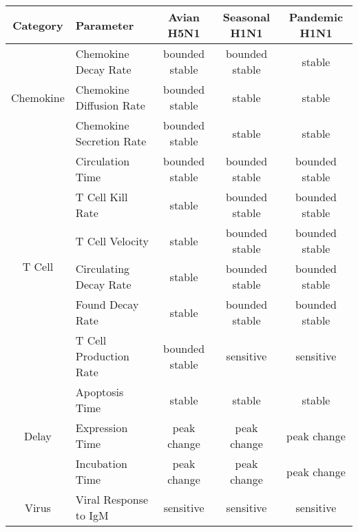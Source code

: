 \documentclass[10pt]{article}
\begin{document}
\begin{table}[!ht]
\begin{center}
\begin{tabular}{| c | l | c c c |}
  \hline                        
  Category & Parameter & Avian H5N1 & Seasonal H1N1 & Pandemic H1N1 \\
  \hline
  \multirow{3}{*}{Chemokine} & Chemokine Decay Rate & \cellcolor{blue!30}bounded stable & \cellcolor{blue!30}bounded stable & \cellcolor{green!50}stable \\
  & Chemokine Diffusion Rate & \cellcolor{blue!30}bounded stable & \cellcolor{green!50}stable& \cellcolor{green!50}stable \\
  & Chemokine Secretion Rate & \cellcolor{blue!30}bounded stable & \cellcolor{green!50}stable & \cellcolor{green!50}stable \\
  \hline
  \multirow{6}{*}{T Cell} & Circulation Time & \cellcolor{blue!30}bounded stable & \cellcolor{blue!30}bounded stable & \cellcolor{blue!30}bounded stable \\
  & T Cell Kill Rate & \cellcolor{green!50}stable & \cellcolor{blue!30}bounded stable & \cellcolor{blue!30}bounded stable \\
  & T Cell Velocity & \cellcolor{green!50}stable & \cellcolor{blue!30}bounded stable & \cellcolor{blue!30}bounded stable \\
  & Circulating Decay Rate & \cellcolor{green!50}stable & \cellcolor{blue!30}bounded stable& \cellcolor{blue!30}bounded stable \\
  & Found Decay Rate & \cellcolor{green!50}stable & \cellcolor{blue!30}bounded stable & \cellcolor{blue!30}bounded stable \\
  & T Cell Production Rate & \cellcolor{blue!30}bounded stable & \cellcolor{red!40}sensitive & \cellcolor{red!40}sensitive \\
  \hline
  \multirow{3}{*}{Delay} & Apoptosis Time & \cellcolor{green!50}stable & \cellcolor{green!50}stable & \cellcolor{green!50}stable \\
  & Expression Time & \cellcolor{yellow!50}peak change & \cellcolor{yellow!50}peak change & \cellcolor{yellow!50}peak change \\
  & Incubation Time &  \cellcolor{yellow!50}peak change & \cellcolor{yellow!50}peak change & \cellcolor{yellow!50}peak change \\
  \hline 
  \multirow{4}{*}{Virus} & Viral Response to IgM & \cellcolor{red!40}sensitive & \cellcolor{red!40}sensitive & \cellcolor{red!40}sensitive \\

\end{tabular}
\end{center}
\end{table}
\end{document}
